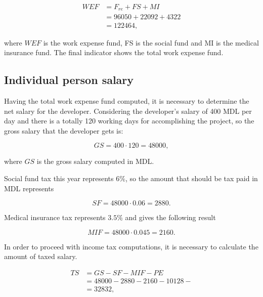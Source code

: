 \begin{equation}
\begin{split}
 WEF &= F_{re} + FS + MI\\
     &= 96050 + 22092 + 4322\\
     &= 122464,
\end{split}
\end{equation}

\noindent
where $WEF$ is the work expense fund, FS is the social fund and MI is the medical insurance fund. The final indicator shows the total work expense fund.

\subsection{Individual person salary}
Having the total work expense fund computed, it is necessary to determine the net salary for the developer. Considering the developer's salary of 400 MDL per day and there is a totally 120 working days for accomplishing the project, so the gross salary that the developer gets is:

\begin{equation}
 GS = 400 \cdot 120 = 48000,
\end{equation}

\noindent where $GS$ is the gross salary computed in MDL.

Social fund tax this year represents $6\%$, so the amount that should be tax paid in MDL represents

\begin{equation}
 SF = 48000 \cdot 0.06 = 2880.
\end{equation}

Medical insurance tax represents $3.5\%$ and gives the following result

\begin{equation}
 MIF = 48000 \cdot 0.045 = 2160.
\end{equation}

In order to proceed with income tax computations, it is necessary to calculate the amount of taxed salary.

\begin{equation}
\begin{split}
 TS &= GS - SF - MIF - PE \\
              &= 48000 -2880 - 2160 - 10128- \\ 
              &= 32832,
\end{split}
\end{equation}

